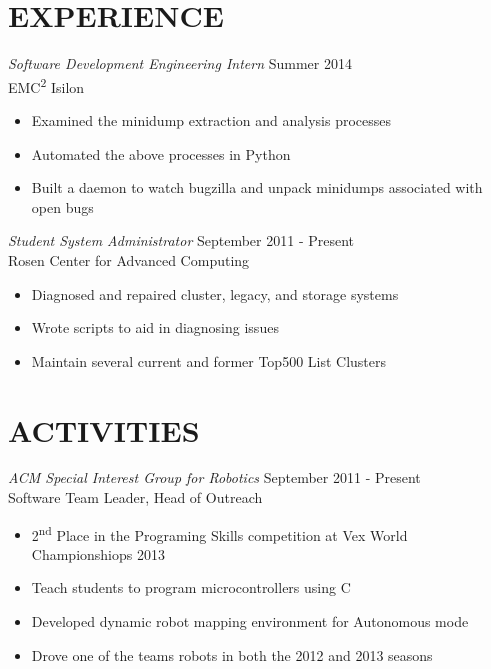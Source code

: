 \documentclass[line,margin]{res}
\begin{document}
\begin{resume}
\section{\textcolor{TealBlue}{EXPERIENCE}} 
				{\sl Software Development Engineering Intern} \hfill Summer 2014 \\
            EMC\textsuperscript{2} Isilon
                \begin{itemize}  \itemsep -2pt
                  \item Examined the minidump extraction and analysis processes
                  \item Automated the above processes in Python
                  \item Built a daemon to watch bugzilla and unpack minidumps associated with open bugs
                \end{itemize}
				{\sl Student System Administrator} \hfill September 2011 - Present \\
                Rosen Center for Advanced Computing
                \begin{itemize}  \itemsep -2pt %
                  \item Diagnosed and repaired cluster, legacy, and storage systems
                  \item Wrote scripts to aid in diagnosing issues
                  \item Maintain several current and former Top500 List Clusters
                \end{itemize}

\section{\textcolor{TealBlue}{ACTIVITIES}}
				{\sl ACM Special Interest Group for Robotics} \hfill September 2011 - Present \\
                Software Team Leader, Head of Outreach
                \begin{itemize}  \itemsep -2pt %
                  \item 2\textsuperscript{nd} Place in the Programing Skills competition at Vex World Championshiops 2013
                  \item Teach students to program microcontrollers using C
                  \item Developed dynamic robot mapping environment for Autonomous mode
                  \item Drove one of the teams robots in both the 2012 and 2013 seasons
                \end{itemize}
                

\end{resume}
\end{document}
